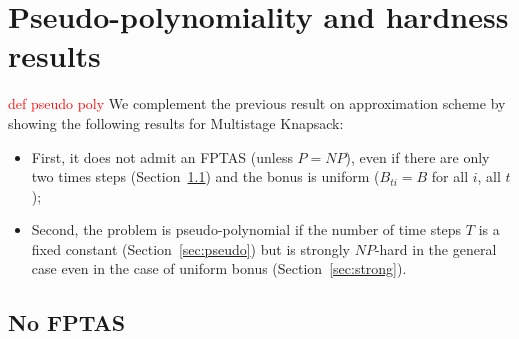\documentclass[a4paper]{book}
\newcommand{\alex}[2]{\textcolor{red}{#1}}
\begin{document}

\section{Pseudo-polynomiality and hardness results}
\alex{def pseudo poly}\\
We complement the previous result on approximation scheme by showing the following results for {\sc Multistage  Knapsack}:
\begin{itemize}
\item First, it does not admit an FPTAS (unless $P=NP$), even if there are only two times steps (Section~\ref{sec:nofptas}) and the bonus is uniform ($B_{ti}=B$ for all $i$, all $t$);
\item Second, the problem is pseudo-polynomial if the number of time steps $T$ is a fixed constant (Section~\ref{sec:pseudo}) but is strongly $NP$-hard in the general case even in the case of uniform bonus (Section~\ref{sec:strong}). 
\end{itemize}


\subsection{No FPTAS}\label{sec:nofptas}
\end{document}
